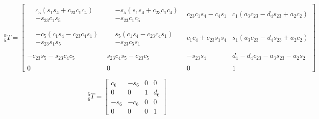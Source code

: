 \begin{equation} \label{eq:T50}
    {_5^{0}}T=\begin{bmatrix}
        \begin{aligned}
             & c_5\left(s_1s_4 + c_{23}c_1c_4\right) \\
             & -s_{23}c_1s_5
        \end{aligned}  &
        \begin{aligned}
             & -s_5\left(s_1s_4 + c_{23}c_1c_4\right) \\
             & -s_{23}c_1c_5
        \end{aligned} & c_{23}c_1s_4 - c_4s_1    &
        c_1\left(a_3c_{23} - d_4s_{23} + a_2c_2\right)                                                                                                       \\\\
        \begin{aligned}
             & -c_5\left(c_1s_4 - c_{23}c_4s_1\right) \\
             & - s_{23}s_1s_5
        \end{aligned} &
        \begin{aligned}
             & s_5\left(c_1s_4 - c_{23}c_4s_1\right) \\
             & - s_{23}c_5s_1
        \end{aligned}  & c_1c_4 + c_{23}s_1s_4    & s_1(a_3c_{23} - d_4s_{23} + a_2c_2)                                                                      \\\\
        - c_{23}s_5 - s_{23}c_4c_5                   & s_{23}c_4s_5 - c_{23}c_5 & -s_{23}s_4                          & d_1 - d_4c_{23} - a_3s_{23} - a_2s_2 \\\\
        0                                            & 0                        & 0                                   & 1
    \end{bmatrix}
\end{equation}

\begin{equation} \label{eq:T65}
    {_6^{5}}T=\begin{bmatrix}
        c_6  & -s_6 & 0 & 0   \\
        0    & 0    & 1 & d_6 \\
        -s_6 & -c_6 & 0 & 0   \\
        0    & 0    & 0 & 1
    \end{bmatrix}
\end{equation}

